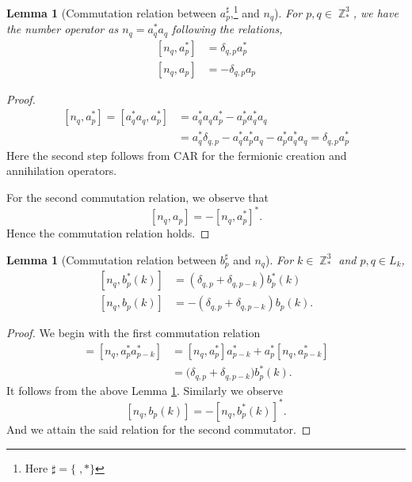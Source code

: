 \documentclass[sn-mathphys, Numbered ,a4paper]{sn-jnl}%
\DeclareMathOperator{\Z}{\mathbb{Z}}
\newcommand{\com}[1]{\left[ #1 \right]}
\theoremstyle{plain}
\newtheorem{lemma}[theorem]{Lemma}
\theoremstyle{definition}
\theoremstyle{remark}
\theoremstyle{plain}
\theoremstyle{definition}
\theoremstyle{remark}
\begin{document}
\begin{lemma}[Commutation relation between $a^\sharp_p$,\footnote{Here 
$\sharp = \{\;,*\} $} and $n_q$]\label{lem:coman}
For $p,q \in \Z^3_*$, we have the number operator as $n_q=a^*_q a_q$ following the relations,
    \begin{align}
        \com{n_q,a^*_p} &= \delta_{q,p}a^*_p\\
        \com{n_q,a_p} &= -\delta_{q,p}a_p
    \end{align}
\end{lemma} 
\begin{proof}
    \begin{align}
        \com{n_q,a^*_p} = \com{a^*_qa_q,a^*_p}&=a^*_qa_qa^*_p - a^*_pa^*_qa_q\nonumber\\
        &= a^*_q\delta_{q,p}- a^*_q a^*_p a_q - a^*_p a^*_q a_q =\delta_{q,p}a^*_p
    \end{align}
    Here the second step follows from CAR for the fermionic creation and annihilation operators.
    
For the second commutation relation, we observe that 
    \begin{equation}
        \com{n_q,a_p}= -\com{n_q,a^*_p}^*.
    \end{equation}
Hence the commutation relation holds.
\end{proof}
\begin{lemma}[Commutation relation between $b^\sharp_p$ and $n_q$]
For $k \in \Z^3_*$ and $p,q \in L_{k}$,
\begin{align}
	\com{n_q,b^*_p(k)} &= \left(\delta_{q,p}+\delta_{q,p-k}\right)b^*_p(k)\\
    \com{n_q,b_p(k)} &= -\left(\delta_{q,p}+\delta_{q,p-k}\right)b_p(k).
\end{align}
\end{lemma} 
\begin{proof} We begin with the first commutation relation
    \begin{align}
        [n_q, b^*_p(k)] = [n_q, a^*_p a^*_{p-k}] &= [n_q, a^*_p] a^*_{p-k} + a^*_p [n_q, a^*_{p-k} ]\nonumber\\
        &=\big( \delta_{q,p} +\delta_{q,p-k} \big) b^*_p(k).
    \end{align}
    It follows from the above Lemma \ref{lem:coman}. Similarly we observe
    \begin{equation}
         \com{n_q,b_p(k)}= -\com{n_q,b^*_p(k)}^*.
    \end{equation}
    And we attain the said relation for the second commutator.
\end{proof}
\end{document}
